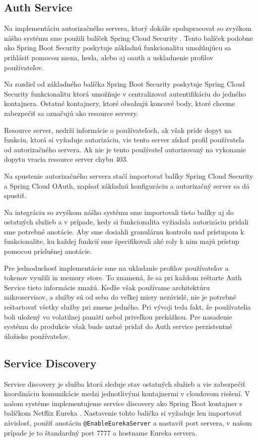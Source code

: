\subsection{Auth Service}  \label{section_auth}

Na implementáciu autorizačného servera, ktorý dokáže spolupracovať so zvyškom nášho systému sme použili balíček Spring Cloud Security \cite{cloud_security}. Tento balíček podobne ako Spring Boot Security poskytuje základnú funkcionalitu umožňujúcu sa prihlásiť pomocou mena, hesla, alebo aj \acrshort{oauth} a uskladnenie profilov používateľov.

Na rozdiel od základného balíčka Spring Boot Security poskytuje Spring Cloud Security funkcionalitu ktorá umožňuje v centralizovať autentifikáciu do jedného kontajnera. Ostatné kontajnery, ktoré obsahujú koncové body, ktoré chceme zabezpečiť sa označujú ako resource servery.

Resource server, nedrží informácie o používateľoch, ak však príde dopyt na funkciu, ktorá si vyžaduje autorizáciu, vie tento server získať profil používateľa od autorizačného servera. Ak nie je tento používateľ autorizovaný na vykonanie dopytu vracia resource server chybu 403.

Na spustenie autorizačného servera stačí importovať balíky  Spring Cloud Security a Spring Cloud OAuth, napísať základnú konfiguráciu a autorizačný server sa dá spustiť.

Na integráciu so zvyškom nášho systému sme importovali tieto balíky aj do ostatných služieb a v prípade, kedy si funkcionalita vyžiadala autorizáciu  pridali sme potrebné anotácie. Aby sme dosiahli granulárnu kontrolu nad prístupom k funkcionalite, ku každej funkcií sme špecifikovali aké roly k nim majú prístup pomocou príslušnej anotácie.

Pre jednoduchosť implementácie sme na ukladanie profilov používateľov a tokenov využili in memory store. To znamená, že sa pri každom reštarte Auth Service tieto informácie zmažú. Keďže však používame architektúru mikroservisov, a služby sú od seba do veľkej miery nezávislé, nie je potrebné reštartovať všetky služby pri zmene jedného. Pri vývoji teda fakt, že používatelia boli uložený vo volatilnej pamäti nebol priveľkou prekážkou. Pre nasadenie systému do produkcie však bude nutné pridať do Auth service perzistentné úložisko používateľov.


\subsection{Service Discovery}
Service discovery je služba ktorá sleduje stav ostatných služieb a vie zabezpečiť koordináciu komunikácie medzi jednotlivými kontajnermi v cloudovom riešení. V našom systéme implementujeme service discovery ako Spring Boot kontajner s balíčkom Netflix Eureka \cite{eureka}. Nastavenie tohto balička si vyžaduje len importovať závislosť, použiť anotáciu \texttt{@EnableEurekaServer} a nastaviť port servera, v našom prípade je to štandardný port 7777 a hostname Eureka servera.

